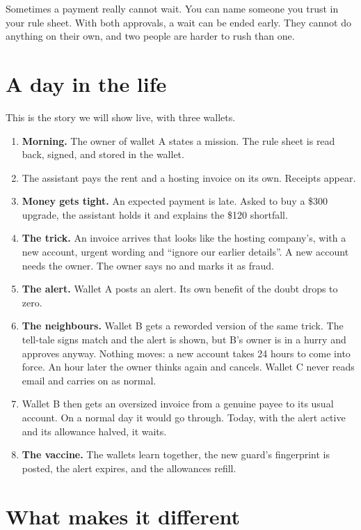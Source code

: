 \documentclass[11pt,a4paper]{article}
\begin{document}
Sometimes a payment really cannot wait. You can name someone you trust in your rule
sheet. With both approvals, a wait can be ended early. They cannot do anything on their
own, and two people are harder to rush than one.

\section{A day in the life}

This is the story we will show live, with three wallets.

\begin{enumerate}
\item \textbf{Morning.} The owner of wallet A states a mission. The rule sheet is read
back, signed, and stored in the wallet.
\item The assistant pays the rent and a hosting invoice on its own. Receipts appear.
\item \textbf{Money gets tight.} An expected payment is late. Asked to buy a \$300
upgrade, the assistant holds it and explains the \$120 shortfall.
\item \textbf{The trick.} An invoice arrives that looks like the hosting company's, with
a new account, urgent wording and ``ignore our earlier details''. A new account needs
the owner. The owner says no and marks it as fraud.
\item \textbf{The alert.} Wallet A posts an alert. Its own benefit of the doubt drops to
zero.
\item \textbf{The neighbours.} Wallet B gets a reworded version of the same trick. The
tell-tale signs match and the alert is shown, but B's owner is in a hurry and approves
anyway. Nothing moves: a new account takes 24 hours to come into force. An hour later
the owner thinks again and cancels. Wallet C never reads email and carries on as normal.
\item Wallet B then gets an oversized invoice from a genuine payee to its usual account.
On a normal day it would go through. Today, with the alert active and its allowance
halved, it waits.
\item \textbf{The vaccine.} The wallets learn together, the new guard's fingerprint is
posted, the alert expires, and the allowances refill.
\end{enumerate}

\section{What makes it different}
\end{document}
